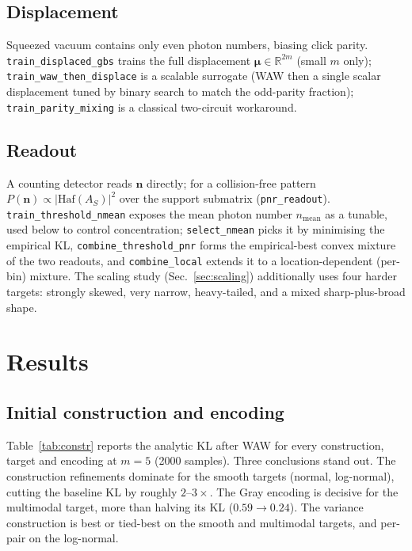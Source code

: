 \documentclass[11pt,a4paper]{article}
\begin{document}
\subsection{Displacement}
Squeezed vacuum contains only even photon numbers, biasing click parity.
\texttt{train\_displaced\_gbs} trains the full displacement
$\boldsymbol\mu\in\mathbb{R}^{2m}$ (small $m$ only);
\texttt{train\_waw\_then\_displace} is a scalable surrogate (WAW then a single
scalar displacement tuned by binary search to match the odd-parity fraction);
\texttt{train\_parity\_mixing} is a classical two-circuit workaround.

\subsection{Readout}
A counting detector reads $\mathbf{n}$ directly; for a collision-free pattern
$P(\mathbf{n})\propto|\mathrm{Haf}(A_S)|^2$ over the support submatrix
(\texttt{pnr\_readout}). \texttt{train\_threshold\_nmean} exposes the mean photon
number $n_{\mathrm{mean}}$ as a tunable, used below to control concentration;
\texttt{select\_nmean} picks it by minimising the empirical KL,
\texttt{combine\_threshold\_pnr} forms the empirical-best convex mixture of the
two readouts, and \texttt{combine\_local} extends it to a location-dependent
(per-bin) mixture. The scaling study (Sec.~\ref{sec:scaling}) additionally uses
four harder targets: strongly skewed, very narrow, heavy-tailed, and a
mixed sharp-plus-broad shape.

\section{Results}

\subsection{Initial construction and encoding}
Table~\ref{tab:constr} reports the analytic KL after WAW for every construction,
target and encoding at $m=5$ (2000 samples). Three conclusions stand out. The
construction refinements dominate for the smooth targets (normal, log-normal),
cutting the baseline KL by roughly $2$--$3\times$. The Gray encoding is decisive
for the multimodal target, more than halving its KL
($0.59\to0.24$). The variance construction is best or tied-best on the smooth
and multimodal targets, and per-pair on the log-normal.
\end{document}
